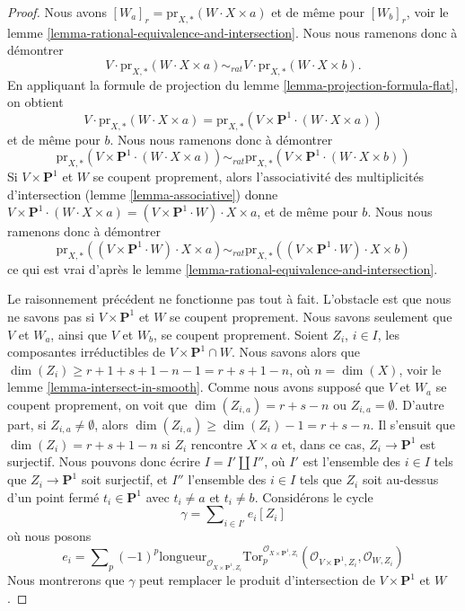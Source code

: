 \begin{proof}
Nous avons $[W_a]_r = \text{pr}_{X,*}(W \cdot X \times a)$ et de même pour
$[W_b]_r$, voir le lemme \ref{lemma-rational-equivalence-and-intersection}.
Nous nous ramenons donc à démontrer
$$
V \cdot \text{pr}_{X,*}( W \cdot X \times a) \sim_{rat} V \cdot
\text{pr}_{X,*}( W \cdot X\times b).
$$
En appliquant la formule de projection du
lemme \ref{lemma-projection-formula-flat}, on obtient
$$
V \cdot \text{pr}_{X,*}( W \cdot X\times a) =
\text{pr}_{X,*}(V \times \mathbf{P}^1 \cdot (W \cdot X\times a))
$$
et de même pour $b$. Nous nous ramenons donc à démontrer
$$
\text{pr}_{X,*}(V \times \mathbf{P}^1 \cdot (W \cdot X\times a))
\sim_{rat}
\text{pr}_{X,*}(V \times \mathbf{P}^1 \cdot (W \cdot X\times b))
$$
Si $V \times \mathbf{P}^1$ et $W$ se coupent proprement, alors
l'associativité des multiplicités d'intersection
(lemme \ref{lemma-associative})
donne $V \times \mathbf{P}^1 \cdot (W \cdot X\times a) =
(V \times \mathbf{P}^1 \cdot W) \cdot X \times a$,
et de même pour $b$. Nous nous ramenons donc à démontrer
$$
\text{pr}_{X,*}((V \times \mathbf{P}^1 \cdot W) \cdot X\times a)
\sim_{rat}
\text{pr}_{X,*}((V \times \mathbf{P}^1 \cdot W) \cdot X\times b)
$$
ce qui est vrai d'après le lemme \ref{lemma-rational-equivalence-and-intersection}.

\medskip\noindent
Le raisonnement précédent ne fonctionne pas tout à fait. L'obstacle est que
nous ne savons pas si $V \times \mathbf{P}^1$ et $W$ se coupent proprement.
Nous savons seulement que $V$ et $W_a$, ainsi que $V$ et $W_b$, se coupent proprement.
Soient $Z_i$, $i \in I$, les composantes irréductibles de
$V \times \mathbf{P}^1 \cap W$. Nous savons alors que
$\dim(Z_i) \geq r + 1 + s + 1 - n - 1 = r + s + 1 - n$, où $n = \dim(X)$, voir
le lemme \ref{lemma-intersect-in-smooth}. Comme nous avons supposé
que $V$ et $W_a$ se coupent proprement, on voit que
$\dim(Z_{i, a}) = r + s - n$ ou $Z_{i, a} = \emptyset$.
D'autre part, si $Z_{i, a} \not = \emptyset$, alors
$\dim(Z_{i, a}) \geq \dim(Z_i) - 1 = r + s - n$.
Il s'ensuit que $\dim(Z_i) = r + s + 1 - n$ si $Z_i$ rencontre $X \times a$
et, dans ce cas, $Z_i \to \mathbf{P}^1$ est surjectif.
Nous pouvons donc écrire $I = I' \amalg I''$, où $I'$ est l'ensemble des $i \in I$
tels que $Z_i \to \mathbf{P}^1$ soit surjectif, et $I''$ l'ensemble des
$i \in I$ tels que $Z_i$ soit au-dessus d'un point fermé $t_i \in \mathbf{P}^1$
avec $t_i \not = a$ et $t_i \not = b$. Considérons le cycle
$$
\gamma = \sum\nolimits_{i \in I'} e_i [Z_i]
$$
où nous posons
$$
e_i = \sum\nolimits_p (-1)^p
\text{longueur}_{\mathcal{O}_{X \times \mathbf{P}^1, Z_i}}
\text{Tor}_p^{\mathcal{O}_{X \times \mathbf{P}^1, Z_i}}(
\mathcal{O}_{V \times \mathbf{P}^1, Z_i}, \mathcal{O}_{W, Z_i})
$$
Nous montrerons que $\gamma$ peut remplacer
le produit d'intersection de $V \times \mathbf{P}^1$ et $W$.


\end{proof}
